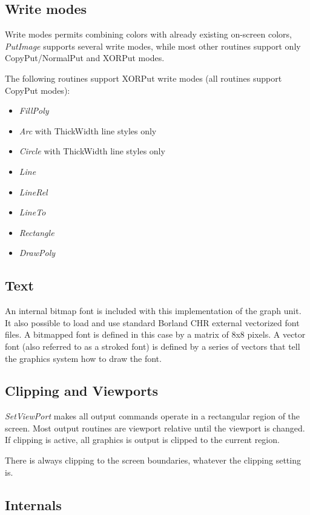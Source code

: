 \subsection{Write modes}

Write modes permits combining colors with already existing on-screen colors,
\textit{PutImage} supports several write modes, while most other routines
support only CopyPut/NormalPut and XORPut modes.

The following routines support XORPut write modes (all routines support
CopyPut modes):

\begin{itemize}
\item \textit{FillPoly}
\item \textit{Arc} with ThickWidth line styles only
\item \textit{Circle} with ThickWidth line styles only
\item \textit{Line}
\item \textit{LineRel}
\item \textit{LineTo}
\item \textit{Rectangle}
\item \textit{DrawPoly}
\end{itemize}

\subsection{Text}
An internal bitmap font is included with this implementation of the graph
unit. It also possible to load and use standard Borland CHR external
vectorized font files. A bitmapped font is defined in this case by
a matrix of 8x8 pixels. A vector font (also referred to as a stroked font)
is defined by a series of vectors that tell the graphics system how to draw
the font.

\subsection{Clipping and Viewports}

\textit{SetViewPort} makes all output commands operate in a rectangular
region of the screen. Most output routines are viewport relative until
the viewport is changed. If clipping is active, all graphics is output
is clipped to the current region.

There is always clipping to the screen boundaries, whatever the clipping
setting is.

\subsection{Internals}

